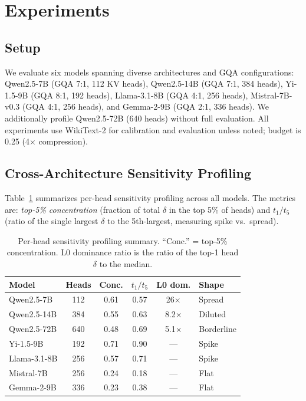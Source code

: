 \documentclass[11pt,a4paper]{article}
\begin{document}
\section{Experiments}

\subsection{Setup}

We evaluate six models spanning diverse architectures and GQA configurations:
Qwen2.5-7B (GQA 7:1, 112 KV heads),
Qwen2.5-14B (GQA 7:1, 384 heads),
Yi-1.5-9B (GQA 8:1, 192 heads),
Llama-3.1-8B (GQA 4:1, 256 heads),
Mistral-7B-v0.3 (GQA 4:1, 256 heads),
and Gemma-2-9B (GQA 2:1, 336 heads).
We additionally profile Qwen2.5-72B (640 heads) without full evaluation.
All experiments use WikiText-2 for calibration and evaluation unless noted; budget is 0.25 (4$\times$ compression).

\subsection{Cross-Architecture Sensitivity Profiling}
\label{sec:profiling}

Table~\ref{tab:profiling} summarizes per-head sensitivity profiling across all models. The metrics are: \emph{top-5\% concentration} (fraction of total $\delta$ in the top 5\% of heads) and $t_1/t_5$ (ratio of the single largest $\delta$ to the 5th-largest, measuring spike vs.\ spread).

\begin{table}[t]
\centering
\small
\begin{tabular}{lccccl}
\toprule
\textbf{Model} & \textbf{Heads} & \textbf{Conc.} & $t_1/t_5$ & \textbf{L0 dom.} & \textbf{Shape} \\
\midrule
Qwen2.5-7B  & 112 & 0.61 & 0.57 & 26$\times$ & Spread \\
Qwen2.5-14B & 384 & 0.55 & 0.63 & 8.2$\times$ & Diluted \\
Qwen2.5-72B & 640 & 0.48 & 0.69 & 5.1$\times$ & Borderline \\
Yi-1.5-9B   & 192 & 0.71 & 0.90 & --- & Spike \\
Llama-3.1-8B & 256 & 0.57 & 0.71 & --- & Spike \\
Mistral-7B  & 256 & 0.24 & 0.18 & --- & Flat \\
Gemma-2-9B  & 336 & 0.23 & 0.38 & --- & Flat \\
\bottomrule
\end{tabular}
\caption{Per-head sensitivity profiling summary. ``Conc.'' = top-5\% concentration. L0 dominance ratio is the ratio of the top-1 head $\delta$ to the median.}
\label{tab:profiling}
\end{table}
\end{document}
